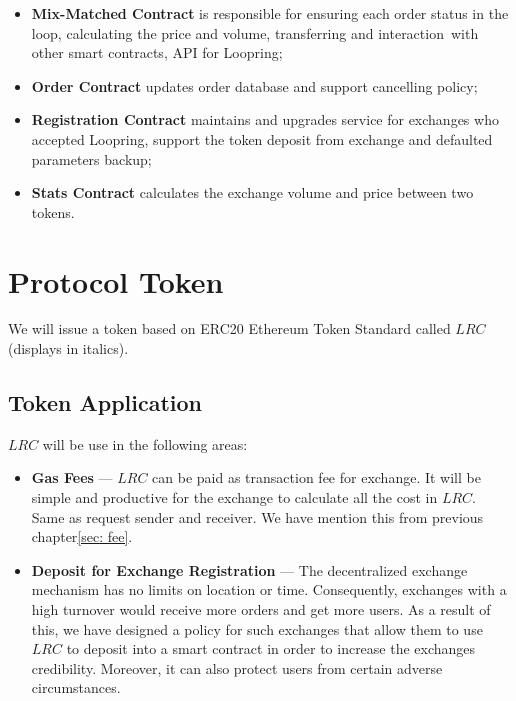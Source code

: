 \documentclass[UTF8,nofonts]{article}
\begin{document}
\begin{itemize}
 \item \textbf{Mix-Matched Contract} is responsible for ensuring each order status in the loop, calculating the price and volume,  transferring and interaction with other smart contracts, API for Loopring;
 \item  \textbf{Order Contract} updates order database and support cancelling policy;
 \item \textbf{Registration Contract} maintains and upgrades service for exchanges who accepted Loopring, support the token deposit from exchange and defaulted parameters backup;
 \item \textbf{Stats Contract} calculates the exchange volume and price between two tokens.

\end{itemize}

\section{Protocol Token \label{sec: protocoltoken}}


We will issue a token based on ERC20 Ethereum Token Standard called $LRC$ (displays in italics).


\subsection{Token Application}

$LRC$ will be use in the following areas:

\begin{itemize}
 \item \textbf{Gas Fees} --- $LRC$ can be paid as transaction fee for exchange. It will be simple and productive for the exchange to calculate all the cost in $LRC$. Same as request sender and receiver. We have mention this from previous chapter\ref{sec: fee}.
 \item \textbf{Deposit for Exchange Registration} --- The decentralized exchange mechanism has no limits on location or time. Consequently, exchanges with a high turnover would receive more orders and get more users. As a result of this, we have designed a policy for such exchanges that allow them to use $LRC$ to deposit into a smart contract in order to increase the exchanges credibility. Moreover, it can also protect users from certain adverse circumstances.
\end{itemize}
\end{document}
